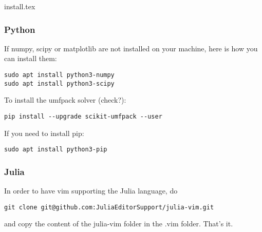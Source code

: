 \begin{flushright} {\tiny {\color{gray} install.tex}} \end{flushright}

\subsubsection{Python}

If numpy, scipy or matplotlib are not installed on your machine, here is how you 
can install them:
\begin{verbatim}
sudo apt install python3-numpy
sudo apt install python3-scipy
\end{verbatim}
To install the umfpack solver (check?):
\begin{verbatim}
pip install --upgrade scikit-umfpack --user
\end{verbatim}
If you need to install pip:
\begin{verbatim}
sudo apt install python3-pip
\end{verbatim}

\subsubsection{Julia}

In order to have vim supporting the Julia language, do 
\begin{verbatim}
git clone git@github.com:JuliaEditorSupport/julia-vim.git
\end{verbatim}
and copy the content of the julia-vim folder in the .vim folder.
That's it.
